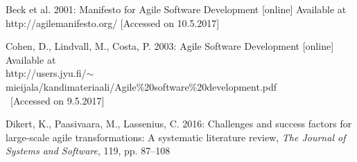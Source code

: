 Beck et al. 2001: Manifesto for Agile Software Development [online] Available at
\\ http://agilemanifesto.org/ [Accessed on 10.5.2017]


Cohen, D., Lindvall, M., Costa, P. 2003: Agile Software Development [online]
Available at \\
http://users.jyu.fi/$\sim$mieijala/kandimateriaali/Agile\%20software\%20development.pdf \\ [Accessed on 9.5.2017]

Dikert, K., Paasivaara, M., Lassenius, C. 2016: Challenges and success factors
for large-scale agile transformations: A systematic literature review,
\textit{The Journal of Systems and Software}, 119, pp. 87–108
